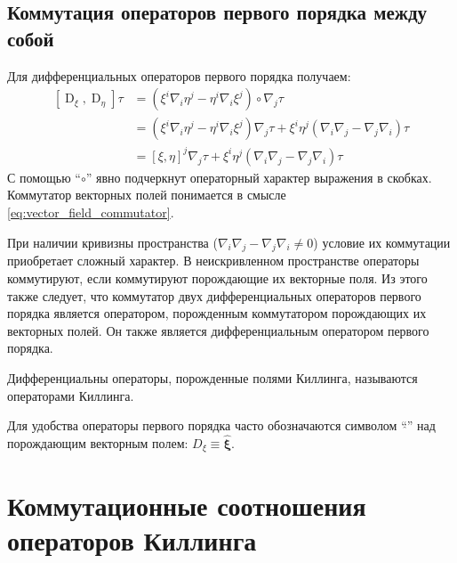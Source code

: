 \documentclass[12pt,a4paper]{article}
\DeclareMathOperator{\D}{D}
\newcommand{\V}[1]{\mathbf{#1}}
\newcommand{\Op}[1]{\hat{\V{#1}}}
\begin{document}
        \subsection{Коммутация операторов первого порядка между собой}

            Для дифференциальных операторов первого порядка получаем:
            \begin{equation}\begin{aligned}
                \left[ \D_\xi, \D_\eta \right] \tau
                    &= (\xi^i \nabla_i \eta^j - \eta^i \nabla_i \xi^j) \circ \nabla_j \tau \\
                    &= (\xi^i \nabla_i \eta^j - \eta^i \nabla_i \xi^j) \nabla_j \tau
                        + \xi^i \eta^j (\nabla_i \nabla_j - \nabla_j \nabla_i) \tau \\
                    &= \left[ \xi, \eta \right]^j \nabla_j \tau
                        + \xi^i \eta^j (\nabla_i \nabla_j - \nabla_j \nabla_i) \tau
            \end{aligned}\end{equation}
            С помощью \enquote{$\circ$} явно подчеркнут операторный характер выражения в скобках. Коммутатор векторных полей понимается в смысле \autoref{eq:vector_field_commutator}.

            При наличии кривизны пространства ($\nabla_i \nabla_j - \nabla_j \nabla_i \neq 0$) условие их коммутации приобретает сложный характер. В неискривленном пространстве операторы коммутируют, если коммутируют порождающие их векторные поля. Из этого также следует, что коммутатор двух дифференциальных операторов первого порядка является оператором, порожденным коммутатором порождающих их векторных полей. Он также является дифференциальным оператором первого порядка.

            Дифференциальны операторы, порожденные полями Киллинга, называются операторами Киллинга.

            Для удобства операторы первого порядка часто обозначаются символом \enquote{$\hat{ }$} над порождающим векторным полем: $D_\xi \equiv \Op\xi$.


    \section{Коммутационные соотношения операторов Киллинга}
\end{document}
